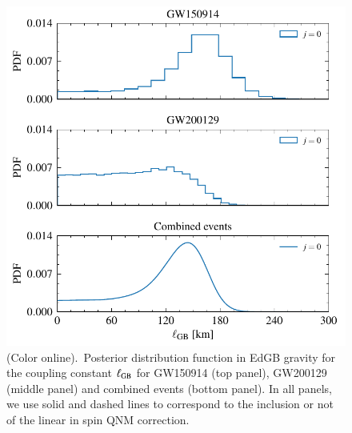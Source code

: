 \documentclass[twocolumn,prd,aps,superscriptaddress,preprintnumbers,tightenlines,showpacs,nofootinbib,amsfonts,amsmath,longbibliography]{revtex4-1}
\begin{document}
\begin{figure}[t]
\includegraphics[width=\columnwidth]{figs/edgb_posteriors_combined.pdf}
\caption{(Color online).~Posterior distribution function in EdGB gravity
for the coupling constant $\ell_{\rm GB}$ for GW150914 (top panel), GW200129 (middle panel)
and combined events (bottom panel).
%
In all panels, we use solid and dashed lines to correspond to the inclusion or not of the linear
in spin QNM correction.}
\label{fig:sGB_exec_sum}
\end{figure}
\end{document}
